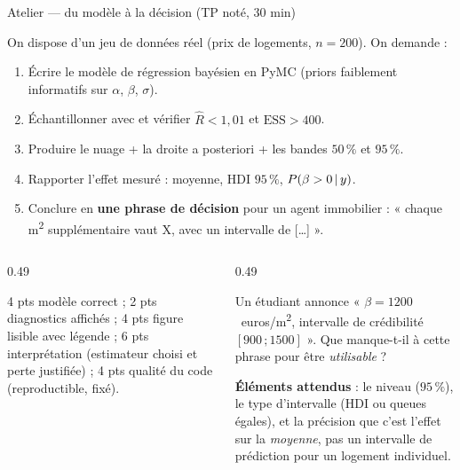 \begin{frame}{Atelier --- du modèle à la décision (TP noté, 30 min)}
\footnotesize
\vspace{-2mm}
\begin{abox}[Énoncé du TP]
On dispose d'un jeu de données réel (prix de logements, $n = 200$). On demande :
\begin{enumerate}
  \item Écrire le modèle de régression bayésien en PyMC (priors faiblement
        informatifs sur $\alpha$, $\beta$, $\sigma$).
  \item Échantillonner avec  et vérifier $\hat R < 1{,}01$ et
        $\mathrm{ESS} > 400$.
  \item Produire le nuage + la droite a posteriori + les bandes $50\,\%$ et
        $95\,\%$.
  \item Rapporter l'effet mesuré : moyenne, HDI $95\,\%$, $P(\beta > 0 \,\vert\, y)$.
  \item Conclure en \textbf{une phrase de décision} pour un agent immobilier :
        « chaque m\textsuperscript{2} supplémentaire vaut X, avec un intervalle
        de [\ldots] ».
\end{enumerate}
\end{abox}
\vspace{1mm}
\begin{columns}[t]
\begin{column}{0.49\textwidth}
\begin{kbox}
4 pts modèle correct ; 2 pts diagnostics affichés ; 4 pts figure lisible avec
légende ; 6 pts interprétation (estimateur choisi et perte justifiée) ;
4 pts qualité du code (reproductible,  fixé).
\end{kbox}
\end{column}
\begin{column}{0.49\textwidth}
\begin{qbox}
Un étudiant annonce « $\beta = 1200$~euros/m\textsuperscript{2}, intervalle de
crédibilité $[900\,;1500]$ ». Que manque-t-il à cette phrase pour être
\emph{utilisable} ?
\vspace{1mm}

\textbf{Éléments attendus} : le niveau ($95\,\%$), le type d'intervalle (HDI ou
queues égales), et la précision que c'est l'effet sur la \emph{moyenne}, pas un
intervalle de prédiction pour un logement individuel.
\end{qbox}
\end{column}
\end{columns}
\end{frame}

